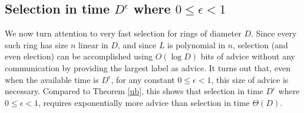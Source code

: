 \documentclass[11pt]{article}
\begin{document}
\subsection{Selection in time $D^{\epsilon}$ where $0 \leq\epsilon < 1$}

We now turn attention to very fast selection for rings of diameter $D$. Since every such ring has size $n$ linear in $D$, and since $L$ is polynomial in $n$, selection (and even election) can be 
accomplished using $O(\log D)$ bits of advice without any communication by providing the largest label as advice.
It turns out that, even when the available time is $D^{\epsilon}$, for any constant $0 \leq\epsilon < 1$, this size of advice is necessary.  Compared to Theorem \ref{ub},
this shows that
selection in time $D^{\epsilon}$ where $0 \leq\epsilon < 1$, requires exponentially more advice
than selection in time $\Theta(D)$.
\end{document}
